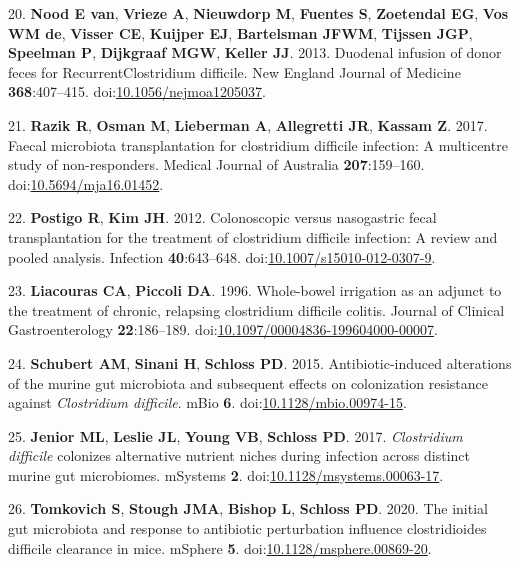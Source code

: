 \documentclass[
  11pt,
]{article}
\begin{document}
\leavevmode\hypertarget{ref-vanNood2013}{}%
20. \textbf{Nood E van}, \textbf{Vrieze A}, \textbf{Nieuwdorp M},
\textbf{Fuentes S}, \textbf{Zoetendal EG}, \textbf{Vos WM de},
\textbf{Visser CE}, \textbf{Kuijper EJ}, \textbf{Bartelsman JFWM},
\textbf{Tijssen JGP}, \textbf{Speelman P}, \textbf{Dijkgraaf MGW},
\textbf{Keller JJ}. 2013. Duodenal infusion of donor feces for
RecurrentClostridium difficile. New England Journal of Medicine
\textbf{368}:407--415.
doi:\href{https://doi.org/10.1056/nejmoa1205037}{10.1056/nejmoa1205037}.

\leavevmode\hypertarget{ref-Razik2017}{}%
21. \textbf{Razik R}, \textbf{Osman M}, \textbf{Lieberman A},
\textbf{Allegretti JR}, \textbf{Kassam Z}. 2017. Faecal microbiota
transplantation for clostridium difficile infection: A multicentre study
of non-responders. Medical Journal of Australia \textbf{207}:159--160.
doi:\href{https://doi.org/10.5694/mja16.01452}{10.5694/mja16.01452}.

\leavevmode\hypertarget{ref-Postigo2012}{}%
22. \textbf{Postigo R}, \textbf{Kim JH}. 2012. Colonoscopic versus
nasogastric fecal transplantation for the treatment of clostridium
difficile infection: A review and pooled analysis. Infection
\textbf{40}:643--648.
doi:\href{https://doi.org/10.1007/s15010-012-0307-9}{10.1007/s15010-012-0307-9}.

\leavevmode\hypertarget{ref-Liacouras1996}{}%
23. \textbf{Liacouras CA}, \textbf{Piccoli DA}. 1996. Whole-bowel
irrigation as an adjunct to the treatment of chronic, relapsing
clostridium difficile colitis. Journal of Clinical Gastroenterology
\textbf{22}:186--189.
doi:\href{https://doi.org/10.1097/00004836-199604000-00007}{10.1097/00004836-199604000-00007}.

\leavevmode\hypertarget{ref-Schubert2015}{}%
24. \textbf{Schubert AM}, \textbf{Sinani H}, \textbf{Schloss PD}. 2015.
Antibiotic-induced alterations of the murine gut microbiota and
subsequent effects on colonization resistance against \emph{Clostridium
difficile}. mBio \textbf{6}.
doi:\href{https://doi.org/10.1128/mbio.00974-15}{10.1128/mbio.00974-15}.

\leavevmode\hypertarget{ref-Jenior2017}{}%
25. \textbf{Jenior ML}, \textbf{Leslie JL}, \textbf{Young VB},
\textbf{Schloss PD}. 2017. \emph{Clostridium difficile} colonizes
alternative nutrient niches during infection across distinct murine gut
microbiomes. mSystems \textbf{2}.
doi:\href{https://doi.org/10.1128/msystems.00063-17}{10.1128/msystems.00063-17}.

\leavevmode\hypertarget{ref-Tomkovich2020}{}%
26. \textbf{Tomkovich S}, \textbf{Stough JMA}, \textbf{Bishop L},
\textbf{Schloss PD}. 2020. The initial gut microbiota and response to
antibiotic perturbation influence clostridioides difficile clearance in
mice. mSphere \textbf{5}.
doi:\href{https://doi.org/10.1128/msphere.00869-20}{10.1128/msphere.00869-20}.
\end{document}
